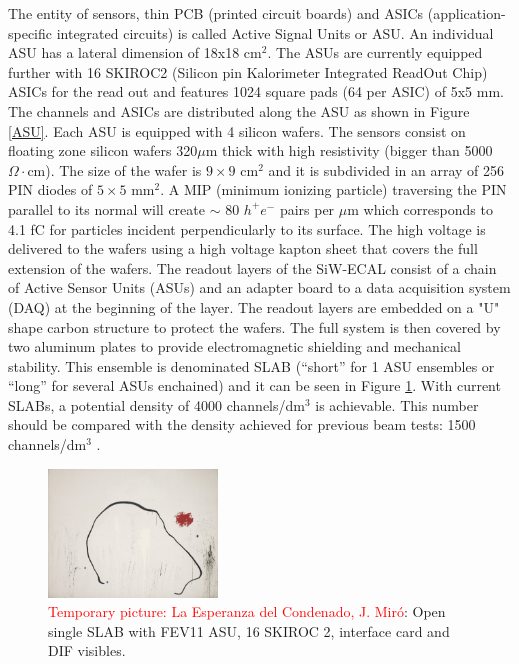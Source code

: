 \documentclass[final,3p,times,twocolumn]{elsarticle}
\newcommand{\todo}[1]{\textcolor{red}{{#1}}}
\begin{document}
The entity
of sensors, thin PCB (printed circuit boards) and ASICs (application-specific integrated circuits)
is called Active Signal Units or ASU.
An individual ASU has a lateral dimension of 18x18 cm$^{2}$.
The ASUs are currently equipped
further with 16 SKIROC2\cite{}  (Silicon pin Kalorimeter Integrated ReadOut Chip)
ASICs for the read out and features 1024 square pads (64 per ASIC) of 5x5 mm.
The channels and ASICs are distributed along the ASU as shown in Figure \ref{ASU}.
Each ASU is equipped with 4 silicon wafers. The sensors consist on floating zone silicon wafers
320$\mu$m thick with high resistivity (bigger than 5000 $\Omega\cdot$cm).
The size of the wafer is $9\times9$ cm$^{2}$ and it is subdivided in an array of 256 PIN diodes of $5\times5$ mm$^{2}$.
A MIP (minimum ionizing particle) traversing the PIN parallel to its normal will create $\sim$ 80 $h^{+}e^{-}$ pairs per $\mu$m which corresponds to 4.1 fC
for particles incident perpendicularly to its surface.
The high voltage is delivered to the wafers using a high voltage kapton sheet that covers the full extension of the wafers.
The readout layers of the SiW-ECAL consist of a chain of Active Sensor Units (ASUs) and an adapter board
to a data acquisition system (DAQ) at the beginning of the layer.
The readout layers are embedded on a "U" shape carbon structure to protect the wafers.
The full system is then covered by two aluminum plates
to provide electromagnetic shielding and mechanical stability.
This ensemble is denominated SLAB
(``short'' for 1 ASU ensembles or ``long'' for several ASUs enchained) and it can be seen in
Figure \ref{ASU2}.
With current SLABs, a potential density of
4000 channels/dm$^{3}$ is achievable. This number should be compared with
the density achieved for previous beam tests: 1500 channels/dm$^{3}$ \cite{Amjad:2014tha}.

\begin{figure}[!t]
  \centering
    \includegraphics[width=0.4\textwidth]{../figs/test.jpg} 
  \caption{\todo{Temporary picture: La Esperanza del Condenado, J. Miró}: Open single SLAB with FEV11 ASU, 16 SKIROC 2, interface card and DIF visibles. }
\label{ASU2}
\end{figure}
\end{document}
